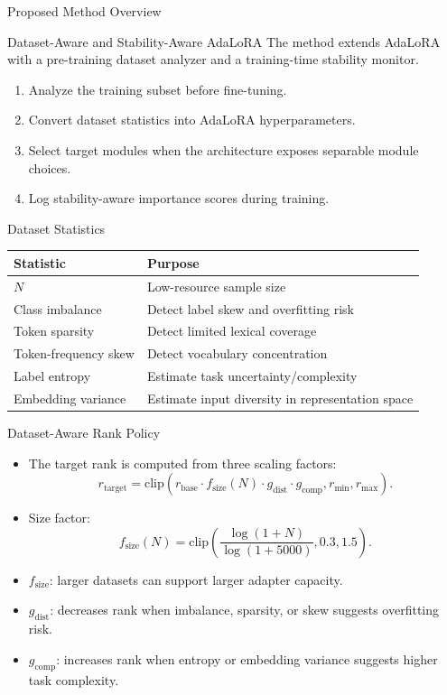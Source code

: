 \begin{frame}{Proposed Method Overview}
\begin{block}{Dataset-Aware and Stability-Aware AdaLoRA}
The method extends AdaLoRA with a pre-training dataset analyzer and a training-time stability monitor.
\end{block}

\vspace{8pt}
\begin{enumerate}
  \item Analyze the training subset before fine-tuning.
  \item Convert dataset statistics into AdaLoRA hyperparameters.
  \item Select target modules when the architecture exposes separable module choices.
  \item Log stability-aware importance scores during training.
\end{enumerate}
\end{frame}

\begin{frame}{Dataset Statistics}
\begin{table}
\centering
\small
\begin{tabular}{ll}
\toprule
Statistic & Purpose \\
\midrule
\(N\) & Low-resource sample size \\
Class imbalance & Detect label skew and overfitting risk \\
Token sparsity & Detect limited lexical coverage \\
Token-frequency skew & Detect vocabulary concentration \\
Label entropy & Estimate task uncertainty/complexity \\
Embedding variance & Estimate input diversity in representation space \\
\bottomrule
\end{tabular}
\end{table}
\end{frame}

\begin{frame}{Dataset-Aware Rank Policy}
\begin{itemize}
  \item The target rank is computed from three scaling factors:
  \[
    r_{\mathrm{target}}
    =
    \mathrm{clip}
    \left(
      r_{\mathrm{base}}
      \cdot f_{\mathrm{size}}(N)
      \cdot g_{\mathrm{dist}}
      \cdot g_{\mathrm{comp}},
      r_{\min}, r_{\max}
    \right).
  \]
  \item Size factor:
  \[
    f_{\mathrm{size}}(N)
    =
    \mathrm{clip}
    \left(
      \frac{\log(1+N)}{\log(1+5000)}, 0.3, 1.5
    \right).
  \]
  \item \(f_{\mathrm{size}}\): larger datasets can support larger adapter capacity.
  \item \(g_{\mathrm{dist}}\): decreases rank when imbalance, sparsity, or skew suggests overfitting risk.
  \item \(g_{\mathrm{comp}}\): increases rank when entropy or embedding variance suggests higher task complexity.
\end{itemize}
\end{frame}


